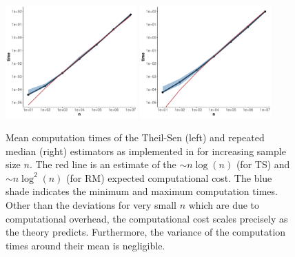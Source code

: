 \begin{figure}[h]
\includegraphics[width = 0.45\textwidth]{benchmark_largen_TS.pdf}
\includegraphics[width = 0.45\textwidth]{benchmark_largen_RM.pdf}
\caption{Mean computation times of the Theil-Sen (left) and repeated median (right) estimators as implemented in  for increasing sample size $n$. The red line is an estimate of the $\sim n\log(n)$ (for TS) and $\sim n\log^2(n)$ (for RM) expected computational cost. The blue shade indicates the minimum and maximum computation times. Other than the deviations for very small $n$ which are due to computational overhead, the computational cost scales precisely as the theory predicts. Furthermore, the variance of the computation times around their mean is negligible.}
\label{fig:bench_largen}
\end{figure}

\clearpage
